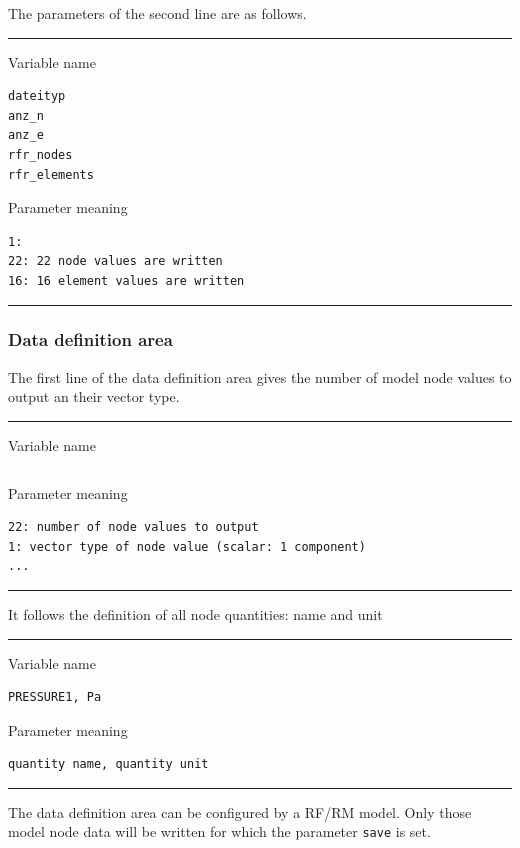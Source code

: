 \bigskip
The parameters of the second line are as follows.

\footnotesize
\hrule
\begin{minipage}[t]{4cm}
Variable name
\begin{verbatim}
dateityp
anz_n
anz_e
rfr_nodes
rfr_elements
\end{verbatim}
\end{minipage}
%
\begin{minipage}[t]{4cm}
Parameter meaning
\begin{verbatim}
1:
22: 22 node values are written
16: 16 element values are written
\end{verbatim}
\end{minipage}
\hrule
\normalsize


\subsubsection{Data definition area}

The first line of the data definition area gives the number of model node values
to output an their vector type.

\footnotesize
\hrule
\begin{minipage}[t]{4cm}
Variable name
\begin{verbatim}
\end{verbatim}
\end{minipage}
%
\begin{minipage}[t]{4cm}
Parameter meaning
\begin{verbatim}
22: number of node values to output
1: vector type of node value (scalar: 1 component)
...
\end{verbatim}
\end{minipage}
\hrule
\normalsize

\bigskip
It follows the definition of all node quantities: name and unit

\footnotesize
\hrule
\begin{minipage}[t]{4cm}
Variable name
\begin{verbatim}
PRESSURE1, Pa
\end{verbatim}
\end{minipage}
%
\begin{minipage}[t]{4cm}
Parameter meaning
\begin{verbatim}
quantity name, quantity unit
\end{verbatim}
\end{minipage}
\hrule
\normalsize

\bigskip
The data definition area can be configured by a RF/RM model.
Only those model node data will be written for which the parameter \texttt{save} is set.

